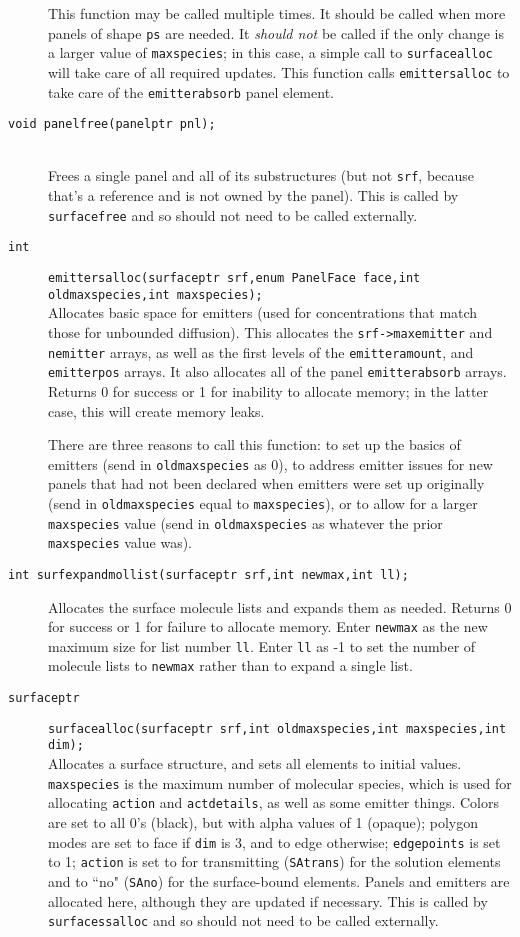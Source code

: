 \documentclass {book}
\newcommand {\ttt} {\texttt}
\begin{document}
\begin{description}
This function may be called multiple times. It should be called when more panels of shape \ttt{ps} are needed. It \emph{should not} be called if the only change is a larger value of \ttt{maxspecies}; in this case, a simple call to \ttt{surfacealloc} will take care of all required updates. This function calls \ttt{emittersalloc} to take care of the \ttt{emitterabsorb} panel element.

\item[\ttt{void panelfree(panelptr pnl);}]
\hfill \\
Frees a single panel and all of its substructures (but not \ttt{srf}, because that's a reference and is not owned by the panel). This is called by \ttt{surfacefree} and so should not need to be called externally.

\item[\ttt{int}]
\ttt{emittersalloc(surfaceptr srf,enum PanelFace face,int oldmaxspecies,int maxspecies);}
\hfill \\
Allocates basic space for emitters (used for concentrations that match those for unbounded diffusion). This allocates the \ttt{srf->maxemitter} and \ttt{nemitter} arrays, as well as the first levels of the \ttt{emitteramount}, and \ttt{emitterpos} arrays. It also allocates all of the panel \ttt{emitterabsorb} arrays. Returns 0 for success or 1 for inability to allocate memory; in the latter case, this will create memory leaks.

There are three reasons to call this function: to set up the basics of emitters (send in \ttt{oldmaxspecies} as 0), to address emitter issues for new panels that had not been declared when emitters were set up originally (send in \ttt{oldmaxspecies} equal to \ttt{maxspecies}), or to allow for a larger \ttt{maxspecies} value (send in \ttt{oldmaxspecies} as whatever the prior \ttt{maxspecies} value was).

\item[\ttt{int surfexpandmollist(surfaceptr srf,int newmax,int ll);}]
\hfill
Allocates the surface molecule lists and expands them as needed. Returns 0 for success or 1 for failure to allocate memory. Enter \ttt{newmax} as the new maximum size for list number \ttt{ll}. Enter \ttt{ll} as -1 to set the number of molecule lists to \ttt{newmax} rather than to expand a single list.

\item[\ttt{surfaceptr}]
\ttt{surfacealloc(surfaceptr srf,int oldmaxspecies,int maxspecies,int dim);}
\hfill \\
Allocates a surface structure, and sets all elements to initial values. \ttt{maxspecies} is the maximum number of molecular species, which is used for allocating \ttt{action} and \ttt{actdetails}, as well as some emitter things. Colors are set to all 0's (black), but with alpha values of 1 (opaque); polygon modes are set to face if \ttt{dim} is 3, and to edge otherwise; \ttt{edgepoints} is set to 1; \ttt{action} is set to for transmitting (\ttt{SAtrans}) for the solution elements and to ``no" (\ttt{SAno}) for the surface-bound elements. Panels and emitters are allocated here, although they are updated if necessary. This is called by \ttt{surfacessalloc} and so should not need to be called externally.


\end{description}
\end{document}
